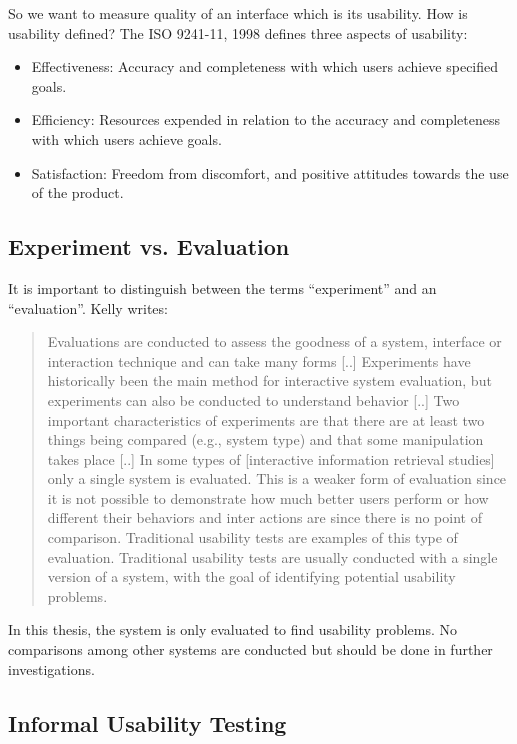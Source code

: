 \documentclass[11pt]{report}
\begin{document}
So we want to measure quality of an interface which is its usability. How is usability defined? The ISO 9241-11, 1998 \cite{ISO} defines three aspects of usability:
\begin{itemize}
	\item Effectiveness: Accuracy and completeness with which users achieve specified goals.
	\item Efficiency: Resources expended in relation to the accuracy and completeness with which users achieve goals.
	\item Satisfaction: Freedom from discomfort, and positive attitudes towards the use of the product.
\end{itemize}

\subsection{Experiment vs. Evaluation}

It is important to distinguish between the terms ``experiment'' and an ``evaluation''. Kelly \cite{Kelly2007} writes:
\begin{quote}
Evaluations are conducted to assess the goodness of a system, interface or interaction technique and can take many forms [..] Experiments have historically been the main method for interactive system evaluation, but experiments can also be conducted to understand behavior [..] Two important characteristics of experiments are that there are at least two things being compared (e.g., system type) and that some manipulation takes place [..] In some types of [interactive information retrieval studies] only a single system is evaluated. This is a weaker form of evaluation since it is not possible to demonstrate how much better users perform or how different their behaviors and inter actions are since there is no point of comparison. Traditional usability tests are examples of this type of evaluation. Traditional usability tests are usually conducted with a single version of a system, with the goal of identifying potential usability problems.	
\end{quote}

In this thesis, the system is only evaluated to find usability problems. No comparisons among other systems are conducted but should be done in further investigations.

\subsection{Informal Usability Testing}
\end{document}

